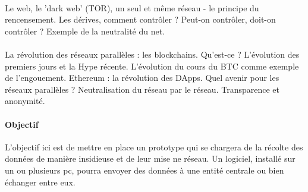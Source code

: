 \paragraph{} Le web, le 'dark web' (TOR), un seul et même réseau - le principe du rencensement. 
Les dérives, comment contrôler ? Peut-on contrôler, doit-on contrôler ? Exemple de la neutralité du net.

\paragraph{} La révolution des réseaux parallèles : les blockchains. Qu'est-ce ? L'évolution des premiers jours et 
la Hype récente. L'évolution du cours du BTC comme exemple de l'engouement. Ethereum : la révolution des DApps.
Quel avenir pour les réseaux parallèles ? Neutralisation du réseau par le réseau. Transparence et anonymité.

\paragraph{Objectif} L'objectif ici est de mettre en place un prototype qui se chargera de la récolte des données
de manière insidieuse et de leur mise ne réseau. Un logiciel, installé sur un ou plusieurs pc,
pourra envoyer des données à une entité centrale ou bien échanger entre eux.
